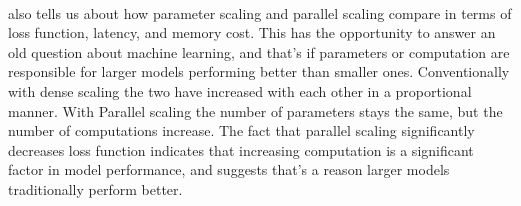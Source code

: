 {
\begin{table}[t]
\caption{Copy of comparison table from \textcite{chen_parallel_2025}}
\centering
{}
\label{tab:compare}
\end{table}
}

\paragraph{}\cite{chen_parallel_2025} also tells us about how parameter scaling and parallel scaling compare in terms of loss function, latency, and memory cost. This has the opportunity to answer an old question about machine learning, and that's if parameters or computation are responsible for larger models performing better than smaller ones. Conventionally with dense scaling the two have increased with each other in a proportional manner. With Parallel scaling the number of parameters stays the same, but the number of computations increase. The fact that parallel scaling significantly decreases loss function indicates that increasing computation is a significant factor in model performance, and suggests that's a reason larger models traditionally perform better.


